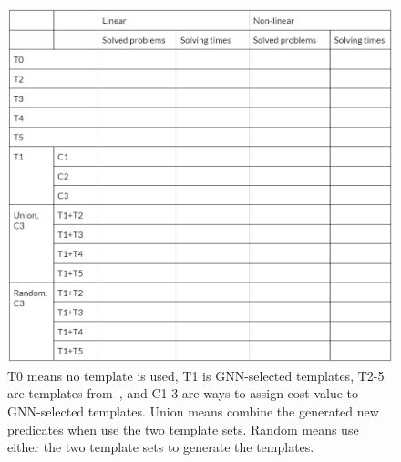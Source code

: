 \begin{figure}[t]
\includegraphics[width=\textwidth]{figures/Snipaste_2022-09-28_11-54-25.png}
\caption{T0 means no template is used, T1 is GNN-selected templates, T2-5 are templates from~\cite{Leroux2016}, and C1-3 are ways to assign cost value to GNN-selected templates. Union means combine the generated new predicates when use the two template sets. Random means use either the two template sets to generate the templates. } \label{fig:results}
\end{figure}




 




% 


